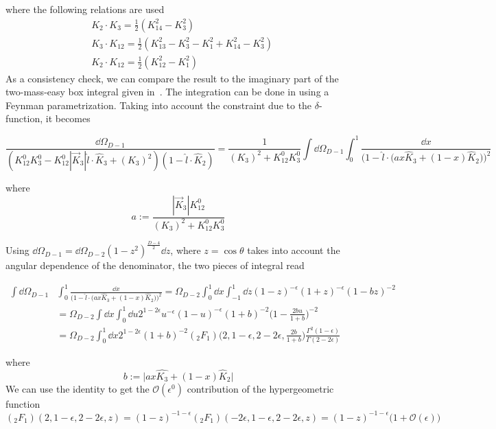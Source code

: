 where the following relations are used
\begin{equation*}
\begin{split}
& K_2\cdot K_3 = \frac{1}{2} (K_{14}^2  - K_3^2)  \\
& K_3\cdot K_{12} = \frac{1}{2}(K_{13}^2 - K_3^2 - K_1^2 + K_{14}^2 - K_3^2)
\\
& K_2\cdot K_{12} = \frac{1}{2}(K_{12}^2 - K_1^2)
\end{split}
\end{equation*}
As a consistency check, we can compare the result to the imaginary part of the two-mass-easy box integral given in~\cite{Britto:2010xq}.
%
%
%
%
\color{gray}
The integration can be done in using a Feynman parametrization.
Taking into account the constraint due to the $\delta$-function, 
it becomes

\begin{equation*}
\frac{\dd \Omega_{D-1}}{(K_{12}^0 K_3^0 - K_{12}^0 |\vec{K}_3| \hat{l}\cdot \hat{K}_3 + (K_3)^2)(1-\hat{l}\cdot\hat{K}_2)}
= \frac{1}{(K_3)^2 + K_{12}^0 K_3^0}\int \dd \Omega_{D-1}\int_0^1\frac{\dd x}{\Big(1-\hat{l}\cdot\big(ax \hat{K}_3 + (1-x)\hat{K}_2\big)\Big)^2}
\end{equation*}

where 
\begin{equation*}
a := \frac{|\vec{K}_3|K_{12}^0}{(K_3)^2 + K_{12}^0 K_3^0}
\end{equation*}

Using $\dd\Omega_{D-1} = \dd \Omega_{D-2}(1-z^2)^{\frac{D-4}{2}}\dd z$, where $z = \cos\theta$ takes into account the angular dependence of the denominator, the two pieces of integral read

\begin{equation*}
\begin{split}
\int \dd \Omega_{D-1} &
\int_0^1\frac{\dd x}{\Big(1-\hat{l}\cdot\big(ax \hat{K}_3 + (1-x)\hat{K}_2\big)\Big)^2}
= \Omega_{D-2}\int_0^1\dd x \int_{-1}^1 \dd z (1-z)^{-\epsilon}(1+z)^{-\epsilon} (1-bz)^{-2}
\\
& = 
\Omega_{D-2}\int\dd x \int^1_0\dd u 2^{1-2\epsilon} u^{-\epsilon}(1-u)^{-\epsilon}(1+b)^{-2}\big(1-\frac{2bu}{1+b}\big)^{-2}
\\
& = 
\Omega_{D-2}\int^1_0 \dd x 2^{1-2\epsilon}(1+b)^{-2} (_2F_1)\big(2,1-\epsilon, 2-2\epsilon, \frac{2b}{1+b}\big)
\frac{\Gamma^2(1-\epsilon)}{\Gamma(2-2\epsilon)} 
\end{split}
\end{equation*}

where 
\begin{equation*}
b := \big| ax \hat{K_3} + (1-x)\hat{K}_2\big|
\end{equation*}
We can use the identity to get the $\mathcal{O}(\epsilon^{0})$ contribution of the hypergeometric function
\begin{equation*}
(_2F_1)(2,1-\epsilon, 2-2\epsilon, z) = (1-z)^{-1-\epsilon}(_2F_1)(-2\epsilon, 1-\epsilon, 2-2\epsilon, z)
=(1-z)^{-1-\epsilon}\big(1+\mathcal{O}(\epsilon)\big)
\end{equation*}

\color{black}


